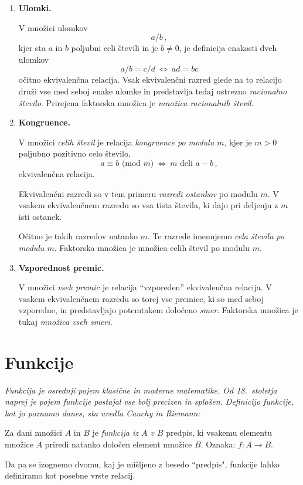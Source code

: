 \documentclass[11pt,paper=b5,footinclude,headinclude]{scrbook} %
\def\cee {{~\Leftrightarrow~}}
\begin{document}
\begin{enumerate}
  \item \textbf{ Ulomki.}

  V množici ulomkov $$a/b\,,$$
  kjer sta $a$ in $b$ poljubni celi števili in je $b\neq 0$, je definicija enakosti dveh ulomkov
  $$a/b = c/d \cee ad = bc$$
  očitno ekvivalenčna relacija. Vsak ekvivalenčni razred glede na to relacijo druži vse med seboj enake ulomke in predstavlja tedaj ustrezno {\em racionalno število}. Prirejena faktorska množica je {\em množica racionalnih števil}.
  \item \textbf{ Kongruence.}


  V množici {\em celih števil} je relacija {\em kongruence po modulu $m$}, kjer je $m> 0$ poljubno pozitivno celo število, $$a\equiv b \textrm{ (mod $m$)}\cee m \textrm{ deli }a-b\,,$$
  ekvivalenčna relacija.

  Ekvivalenčni razredi so v tem primeru {\em razredi ostankov} po modulu $m$. V vsakem ekvivalenčnem razredu so vsa tista števila, ki dajo pri deljenju z $m$ isti ostanek.

  Očitno je takih razredov natanko $m$. Te razrede imenujemo {\em cela števila po modulu $m$}. Faktorska množica je množica celih števil po modulu $m$.

  \item \textbf{ Vzporednost premic.}

V množici {\em vseh premic} je relacija ``vzporeden'' ekvivalenčna relacija. V vsakem ekvivalenčnem razredu so torej vse premice, ki so med seboj vzporedne, in predstavljajo potemtakem določeno {\em smer}. Faktorska množica je tukaj {\em množica vseh smeri}.
\end{enumerate}

\section{Funkcije}

{\em Funkcija je osrednji pojem klasične in moderne matematike. Od 18.~stoletja naprej
je pojem funkcije postajal vse bolj precizen in splošen. Definicijo funkcije, kot jo poznamo danes, sta uvedla Cauchy in Riemann:}

\medskip
Za dani množici $A$ in $B$ je {\em funkcija iz $A$ v $B$} predpis, ki vsakemu elementu množice $A$ priredi natanko določen element množice $B$.
Oznaka: $f:A\to B$.

\medskip
Da pa se izognemo dvomu, kaj je mišljeno z besedo ``predpis", funkcije lahko definiramo kot posebne vrste relacij.
\end{document}
